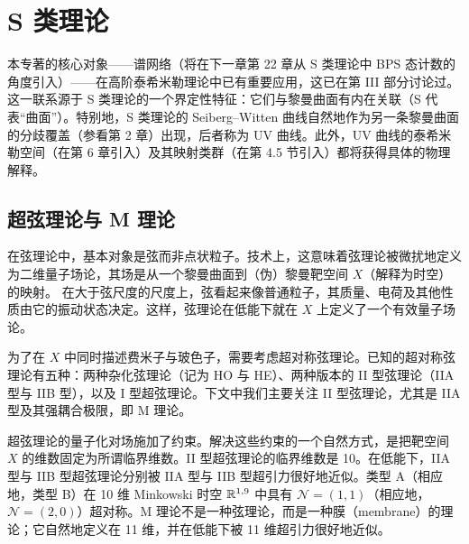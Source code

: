 \chapter{S 类理论}


本专著的核心对象——谱网络（将在下一章第 22 章从 S 类理论中 BPS 态计数的角度引入）——在高阶泰希米勒理论中已有重要应用，这已在第 III 部分讨论过。这一联系源于 S 类理论的一个界定性特征：它们与黎曼曲面有内在关联（S 代表“曲面”）。特别地，S 类理论的 Seiberg–Witten 曲线自然地作为另一条黎曼曲面的分歧覆盖（参看第 2 章）出现，后者称为 UV 曲线。此外，UV 曲线的泰希米勒空间（在第 6 章引入）及其映射类群（在第 4.5 节引入）都将获得具体的物理解释。

\section{超弦理论与 M 理论}

在弦理论中，基本对象是弦而非点状粒子。技术上，这意味着弦理论被微扰地定义为二维量子场论，其场是从一个黎曼曲面到（伪）黎曼靶空间 $X$（解释为时空）的映射。
在大于弦尺度的尺度上，弦看起来像普通粒子，其质量、电荷及其他性质由它的振动状态决定。这样，弦理论在低能下就在 $X$ 上定义了一个有效量子场论。

为了在 $X$ 中同时描述费米子与玻色子，需要考虑超对称弦理论。已知的超对称弦理论有五种：两种杂化弦理论（记为 HO 与 HE）、两种版本的 II 型弦理论（IIA 型与 IIB 型），以及 I 型超弦理论。下文中我们主要关注 II 型弦理论，尤其是 IIA 型及其强耦合极限，即 M 理论。

超弦理论的量子化对场施加了约束。解决这些约束的一个自然方式，是把靶空间 $X$ 的维数固定为所谓临界维数。II 型超弦理论的临界维数是 10。在低能下，IIA 型与 IIB 型超弦理论分别被 IIA 型与 IIB 型超引力很好地近似。类型 A（相应地，类型 B）在 10 维 Minkowski 时空 $\mathbb{R}^{1,9}$ 中具有 $\mathcal{N}=(1,1)$（相应地，$\mathcal{N}=(2,0)$）超对称。M 理论不是一种弦理论，而是一种膜（membrane）的理论；它自然地定义在 11 维，并在低能下被 11 维超引力很好地近似。

